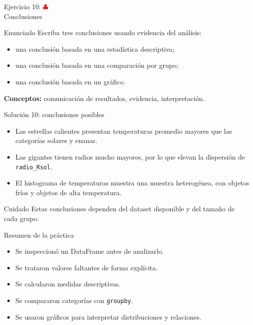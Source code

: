 \documentclass[10pt]{beamer}
\begin{document}
\begin{frame}{Ejercicio 10: \hfill \textcolor{red}{$\clubsuit$} \\ Conclusiones}
  \begin{block}{Enunciado}
    Escriba tres conclusiones usando evidencia del análisis:
    \begin{itemize}
      \item una conclusión basada en una estadística descriptiva;
      \item una conclusión basada en una comparación por grupo;
      \item una conclusión basada en un gráfico.
    \end{itemize}
  \end{block}
  \textbf{Conceptos:} comunicación de resultados, evidencia, interpretación.
\end{frame}

\begin{solutionblock}
\begin{frame}{Solución 10: conclusiones posibles}
  \begin{itemize}
    \item Las estrellas calientes presentan temperaturas promedio mayores que las categorías solares y enanas.
    \item Las gigantes tienen radios mucho mayores, por lo que elevan la dispersión de \texttt{radio\_Rsol}.
    \item El histograma de temperaturas muestra una muestra heterogénea, con objetos fríos y objetos de alta temperatura.
  \end{itemize}
  \begin{alertblock}{Cuidado}
    Estas conclusiones dependen del dataset disponible y del tamaño de cada grupo.
  \end{alertblock}
\end{frame}
\end{solutionblock}

\begin{frame}{Resumen de la práctica}
  \begin{itemize}
    \item Se inspeccionó un DataFrame antes de analizarlo.
    \item Se trataron valores faltantes de forma explícita.
    \item Se calcularon medidas descriptivas.
    \item Se compararon categorías con \texttt{groupby}.
    \item Se usaron gráficos para interpretar distribuciones y relaciones.
  \end{itemize}
\end{frame}
\end{document}
